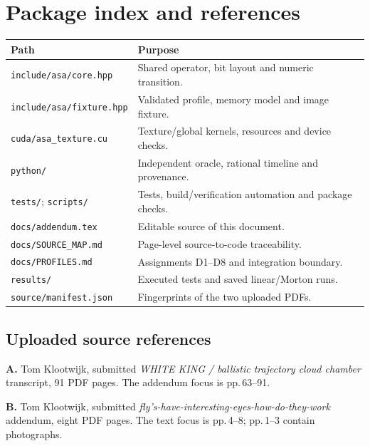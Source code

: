 \documentclass[11pt,a4paper]{article}
\newcommand{\code}[1]{\texttt{#1}}
\begin{document}
\section{Package index and references}
\small
\begin{tabularx}{\textwidth}{@{}P{.36\textwidth}Y@{}}\toprule
\textbf{Path} & \textbf{Purpose}\\\midrule
\code{include/asa/core.hpp} & Shared operator, bit layout and numeric transition.\\
\code{include/asa/fixture.hpp} & Validated profile, memory model and image fixture.\\
\code{cuda/asa\_texture.cu} & Texture/global kernels, resources and device checks.\\
\code{python/} & Independent oracle, rational timeline and provenance.\\
\code{tests/}; \code{scripts/} & Tests, build/verification automation and package checks.\\
\code{docs/addendum.tex} & Editable source of this document.\\
\code{docs/SOURCE\_MAP.md} & Page-level source-to-code traceability.\\
\code{docs/PROFILES.md} & Assignments D1--D8 and integration boundary.\\
\code{results/} & Executed tests and saved linear/Morton runs.\\
\code{source/manifest.json} & Fingerprints of the two uploaded PDFs.\\\bottomrule
\end{tabularx}
\par
\normalsize

\subsection{Uploaded source references}
\textbf{A.} Tom Klootwijk, submitted \emph{WHITE KING / ballistic trajectory cloud chamber} transcript, 91 PDF pages. The addendum focus is pp.\,63--91.\par
\textbf{B.} Tom Klootwijk, submitted \emph{fly's-have-interesting-eyes-how-do-they-work} addendum, eight PDF pages. The text focus is pp.\,4--8; pp.\,1--3 contain photographs.
\end{document}
